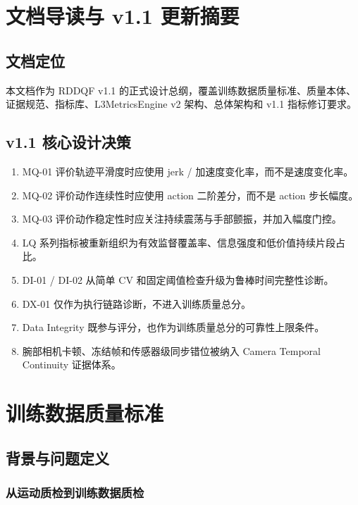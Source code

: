 \documentclass[UTF8,zihao=-4,oneside,openany]{ctexrep}
\begin{document}
\chapter*{文档导读与 v1.1 更新摘要}
\section*{文档定位}
本文档作为 RDDQF v1.1 的正式设计总纲，覆盖训练数据质量标准、质量本体、证据规范、指标库、L3MetricsEngine v2 架构、总体架构和 v1.1 指标修订要求。

\section*{v1.1 核心设计决策}
\begin{enumerate}
\item MQ-01 评价轨迹平滑度时应使用 jerk / 加速度变化率，而不是速度变化率。
\item MQ-02 评价动作连续性时应使用 action 二阶差分，而不是 action 步长幅度。
\item MQ-03 评价动作稳定性时应关注持续震荡与手部颤振，并加入幅度门控。
\item LQ 系列指标被重新组织为有效监督覆盖率、信息强度和低价值持续片段占比。
\item DI-01 / DI-02 从简单 CV 和固定阈值检查升级为鲁棒时间完整性诊断。
\item DX-01 仅作为执行链路诊断，不进入训练质量总分。
\item Data Integrity 既参与评分，也作为训练质量总分的可靠性上限条件。
\item 腕部相机卡顿、冻结帧和传感器级同步错位被纳入 Camera Temporal Continuity 证据体系。
\end{enumerate}

\tableofcontents
\clearpage
{}
\chapter{训练数据质量标准}

\section{背景与问题定义}

\subsection{从运动质检到训练数据质检}
\end{document}
